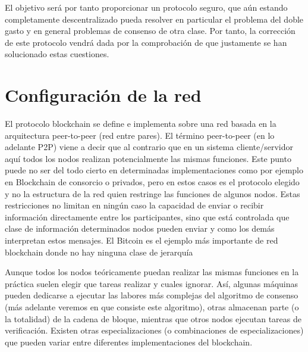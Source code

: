 El objetivo será por tanto proporcionar un protocolo seguro, que aún estando completamente descentralizado pueda resolver en particular el problema del doble gasto y en general problemas de consenso de otra clase. Por tanto, la corrección de este protocolo vendrá dada por la comprobación de que justamente se han solucionado estas cuestiones.

\section{Configuración de la red}
El protocolo blockchain se define e implementa sobre una red basada en la arquitectura peer-to-peer (red entre pares). El término peer-to-peer (en lo adelante P2P) viene a decir que al contrario que en un sistema cliente/servidor aquí todos los nodos realizan potencialmente las mismas funciones. Este punto puede no ser del todo cierto en determinadas implementaciones como por ejemplo en Blockchain de consorcio o privados, pero en estos casos es el protocolo elegido y no la estructura de la red quien restringe las funciones de algunos nodos. Estas restricciones no limitan en ningún caso la capacidad de enviar o recibir información directamente entre los participantes, sino que está controlada que clase de información determinados nodos pueden enviar y como los demás interpretan estos mensajes. El Bitcoin es el ejemplo más importante de red blockchain donde no hay ninguna clase de jerarquía 

Aunque todos los nodos teóricamente puedan realizar las mismas funciones en la práctica suelen elegir que tareas realizar y cuales ignorar. Así, algunas máquinas pueden dedicarse a ejecutar las labores más complejas del algoritmo de consenso (más adelante veremos en que consiste este algoritmo), otras  almacenan parte (o la totalidad) de la cadena de bloque, mientras que otros nodos ejecutan tareas de verificación. Existen otras especializaciones (o combinaciones de especializaciones) que pueden variar entre diferentes implementaciones del blockchain.


